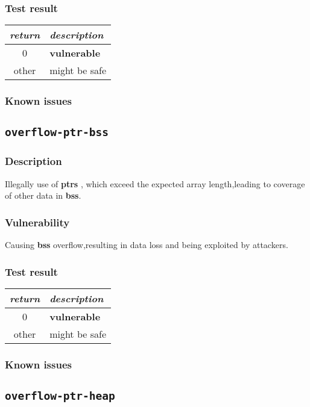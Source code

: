\documentclass[a4paper]{book}
\begin{document}
\subsubsection{Test result}
\begin{tabular}{cl}
  \toprule
  \emph{return}  & \emph{description} \\
  \midrule
  0              & \textbf{vulnerable} \\
  other          & might be safe \\
  \bottomrule
\end{tabular}
\subsubsection{Known issues}
\newpage

\subsection{\texttt{overflow-ptr-bss}}\label{test-overflow-ptr-bss}
\subsubsection{Description}
Illegally use of \textbf{ptrs} , which exceed the expected array length,leading to coverage of other data in \textbf{bss}.

\subsubsection{Vulnerability}
Causing \textbf{bss} overflow,resulting in data loss and being exploited by attackers.
\subsubsection{Test result}
\begin{tabular}{cl}
  \toprule
  \emph{return}  & \emph{description} \\
  \midrule
  0              & \textbf{vulnerable} \\
  other          & might be safe \\
  \bottomrule
\end{tabular}
\subsubsection{Known issues}
\newpage


\subsection{\texttt{overflow-ptr-heap}}\label{test-overflow-ptr-heap}
\end{document}
